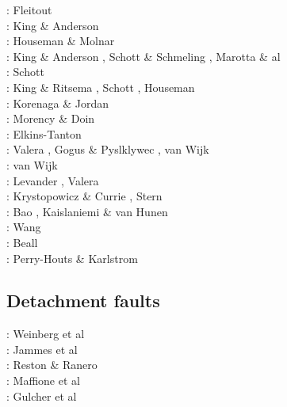 \begin{scriptsize}
\nineteeneightysix: Fleitout \etal \cite{flfy86}\\
\nineteenninetyfive: King \& Anderson \cite{kian95}\\
\nineteenninetyseven: Houseman \& Molnar \cite{homo97}\\
\nineteenninetyeight: King \& Anderson \cite{kian98}, Schott \& Schmeling \cite{scsc98}, 
                      Marotta \& al \cite{mafs98}\\
\nineteenninetynine: Schott \etal \cite{scys99} \\
\twothousand: King \& Ritsema \cite{kiri00}, Schott \etal \cite{scys00}, Houseman \etal \cite{honk00}\\
\twothousandthree: Korenaga \& Jordan \cite{kojo03} \\
\twothousandfour: Morency \& Doin \cite{modo04}\\
\twothousandseven: Elkins-Tanton \cite{elki07}\\
\twothousandeight: Valera \etal \cite{vanv08}, Gogus \& Pyslklywec \cite{gopy08}, 
                   van Wijk \etal \cite{vavg08}\\
\twothousandten: van Wijk \etal \cite{vabv10}\\
\twothousandeleven: Levander \etal \cite{lesm11}, Valera \etal \cite{vanj11}\\
\twothousandthirteen: Krystopowicz \& Currie \cite{krcu13}, Stern \etal \cite{sths13}\\
\twothousandfourteen: Bao \etal \cite{baeg14}, Kaislaniemi \& van Hunen \cite{kava14}\\
\twothousandfifteen: Wang \etal \cite{wahz15}\\
\twothousandseventeen: Beall \etal \cite{bems17}\\
\twothousandeighteen: Perry-Houts \& Karlstrom \cite{peka18}
\end{scriptsize}


\subsection{Detachment faults} 

\begin{scriptsize}
\twothousandseven: Weinberg et al \cite{werr07}\\
\twothousandten: Jammes et al \cite{jaml10}\\
\twothousandeleven: Reston \& Ranero \cite{rera11}\\
\twothousandfifteen: Maffione et al \cite{matv15}\\
\twothousandnineteen: Gulcher et al \cite{gubg19}
\end{scriptsize}

